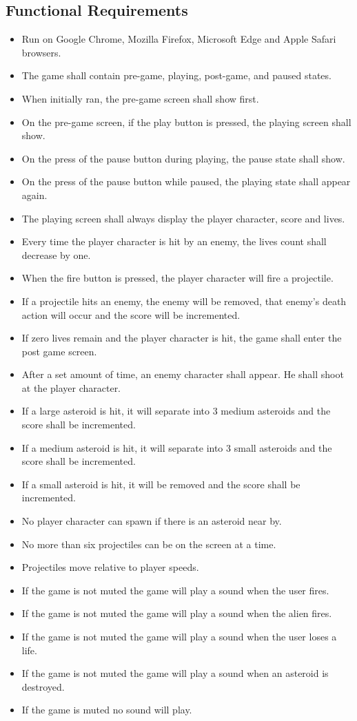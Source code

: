 \documentclass[12pt, titlepage]{article}
\begin{document}
\subsection{Functional Requirements}
  \begin{itemize}
    \item Run on Google Chrome, Mozilla Firefox, Microsoft Edge and Apple Safari browsers.
    \item The game shall contain pre-game, playing, post-game, and paused states.
    \item When initially ran, the pre-game screen shall show first.
    \item On the pre-game screen, if the play button is pressed, the playing screen shall show.
    \item On the press of the pause button during playing, the pause state shall show.
    \item On the press of the pause button while paused, the playing state shall appear again.
    \item The playing screen shall always display the player character, score and lives.
    \item Every time the player character is hit by an enemy, the lives count shall decrease by one.
    \item When the fire button is pressed, the player character will fire a projectile.
    \item If a projectile hits an enemy, the enemy will be removed, that enemy's death action will occur and the score will be incremented.
    \item If zero lives remain and the player character is hit, the game shall enter the post game screen.
    \item After a set amount of time, an enemy character shall appear. He shall shoot at the player character.
    \item If a large asteroid is hit, it will separate into 3 medium asteroids and the score shall be incremented.
    \item If a medium asteroid is hit, it will separate into 3 small asteroids and the score shall be incremented.
    \item If a small asteroid is hit, it will be removed and the score shall be incremented.
    \item No player character can spawn if there is an asteroid near by.
    \item No more than six projectiles can be on the screen at a time.
    \item Projectiles move relative to player speeds.
    \item If the game is not muted the game will play a sound when the user fires.
    \item If the game is not muted the game will play a sound when the alien fires.
    \item If the game is not muted the game will play a sound when the user loses a life.
    \item If the game is not muted the game will play a sound when an asteroid is destroyed.
    \item If the game is muted no sound will play.
  \end{itemize}
\end{document}
